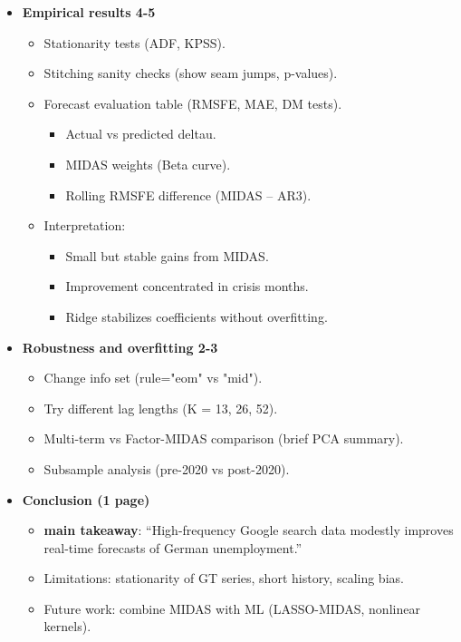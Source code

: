\documentclass{article}
\begin{document}
\begin{itemize}
\item \textbf{Empirical results 4-5}
\begin{itemize}
    \item Stationarity tests (ADF, KPSS).
    \item Stitching sanity checks (show seam jumps, p-values).
    \item Forecast evaluation table (RMSFE, MAE, DM tests).
    \begin{itemize}
        \item Actual vs predicted deltau.
        \item MIDAS weights (Beta curve).
        \item Rolling RMSFE difference (MIDAS – AR3).
    \end{itemize}
    \item Interpretation:
    \begin{itemize}
        \item Small but stable gains from MIDAS.
        \item Improvement concentrated in crisis months.
        \item Ridge stabilizes coefficients without overfitting.
    \end{itemize}
\end{itemize}
\item \textbf{Robustness and overfitting 2-3}
\begin{itemize}
    \item Change info set (rule="eom" vs "mid").
    \item Try different lag lengths (K = 13, 26, 52).
    \item Multi-term vs Factor-MIDAS comparison (brief PCA summary).
    \item Subsample analysis (pre-2020 vs post-2020).
\end{itemize}

\item  \textbf{Conclusion (1 page)}
\begin{itemize}
    \item \textbf{main takeaway}: “High-frequency Google search data modestly improves real-time forecasts of German unemployment.”
    \item Limitations: stationarity of GT series, short history, scaling bias.
    \item Future work: combine MIDAS with ML (LASSO-MIDAS, nonlinear kernels).
\end{itemize}

    
\end{itemize}
\end{document}

